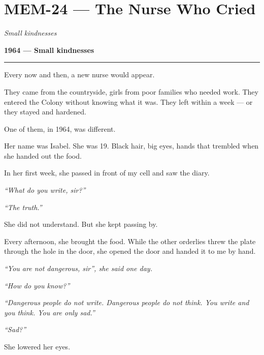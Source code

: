 \section*{\textbf{MEM-24} --- The Nurse Who Cried}

\noindent \textit{Small kindnesses}

\noindent \textbf{1964 --- Small kindnesses}

\vspace{0.5em}\noindent\rule{\textwidth}{0.5pt}\vspace{0.5em}

\noindent Every now and then, a new nurse would appear.

\noindent They came from the countryside, girls from poor families who needed work. They entered the Colony without knowing what it was. They left within a week --- or they stayed and hardened.

\noindent One of them, in 1964, was different.

\noindent Her name was Isabel. She was 19. Black hair, big eyes, hands that trembled when she handed out the food.

\noindent In her first week, she passed in front of my cell and saw the diary.

\noindent \textit{\textquotedblleft{}What do you write, sir?\textquotedblright{}}

\noindent \textit{\textquotedblleft{}The truth.\textquotedblright{}}

\noindent She did not understand. But she kept passing by.

\noindent Every afternoon, she brought the food. While the other orderlies threw the plate through the hole in the door, she opened the door and handed it to me by hand.

\noindent \textit{\textquotedblleft{}You are not dangerous, sir\textquotedblright{}, she said one day.}

\noindent \textit{\textquotedblleft{}How do you know?\textquotedblright{}}

\noindent \textit{\textquotedblleft{}Dangerous people do not write. Dangerous people do not think. You write and you think. You are only sad.\textquotedblright{}}

\noindent \textit{\textquotedblleft{}Sad?\textquotedblright{}}

\noindent She lowered her eyes.

